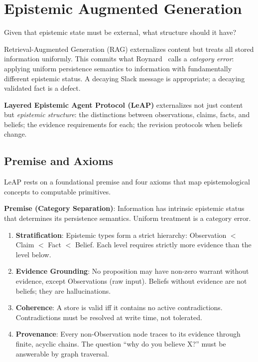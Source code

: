 \documentclass[11pt,letterpaper]{article}
\begin{document}
\section{Epistemic Augmented Generation}
\label{sec:leap}

Given that epistemic state must be external, what structure should it have?

Retrieval-Augmented Generation (RAG) externalizes content but treats all stored information uniformly. This commits what Roynard~\cite{roynard2026} calls a \textit{category error}: applying uniform persistence semantics to information with fundamentally different epistemic status. A decaying Slack message is appropriate; a decaying validated fact is a defect.

\textbf{Layered Epistemic Agent Protocol (LeAP)} externalizes not just content but \textit{epistemic structure}: the distinctions between observations, claims, facts, and beliefs; the evidence requirements for each; the revision protocols when beliefs change.

\subsection{Premise and Axioms}

LeAP rests on a foundational premise and four axioms that map epistemological concepts to computable primitives.

\textbf{Premise (Category Separation)}: Information has intrinsic epistemic status that determines its persistence semantics. Uniform treatment is a category error.

\begin{enumerate}[noitemsep]
    \item[\textbf{A1}] \textbf{Stratification}: Epistemic types form a strict hierarchy: Observation $<$ Claim $<$ Fact $<$ Belief. Each level requires strictly more evidence than the level below.

    \item[\textbf{A2}] \textbf{Evidence Grounding}: No proposition may have non-zero warrant without evidence, except Observations (raw input). Beliefs without evidence are not beliefs; they are hallucinations.

    \item[\textbf{A3}] \textbf{Coherence}: A store is valid iff it contains no active contradictions. Contradictions must be resolved at write time, not tolerated.

    \item[\textbf{A4}] \textbf{Provenance}: Every non-Observation node traces to its evidence through finite, acyclic chains. The question ``why do you believe X?'' must be answerable by graph traversal.
\end{enumerate}
\end{document}
